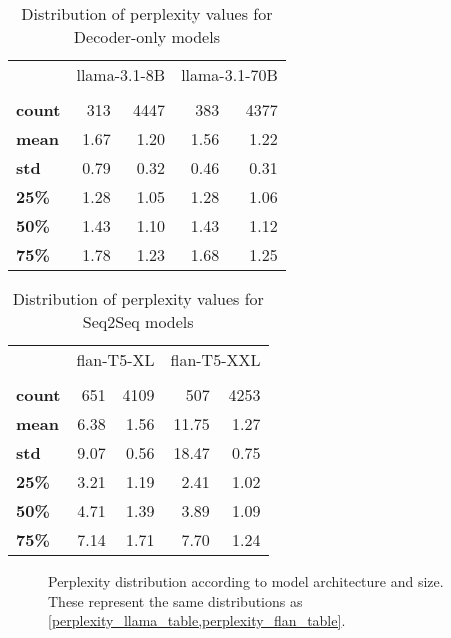 \begin{table}[ht]
	\centering
	\footnotesize
	\begin{tabular}{>{\bfseries}l | r r | r r}
		\toprule
			& \multicolumn{2}{|c}{\ttfamily llama-3.1-8B} & \multicolumn{2}{|c}{\ttfamily llama-3.1-70B} \\
			& \Parametric{} & \Contextual{} & \Parametric{} & \Contextual{} \\
		\midrule
			count &  313 & 4447 &  383 & 4377  \\
			mean  & 1.67 & 1.20 & 1.56 & 1.22  \\
			std   & 0.79 & 0.32 & 0.46 & 0.31  \\
			25\%  & 1.28 & 1.05 & 1.28 & 1.06  \\
			50\%  & 1.43 & 1.10 & 1.43 & 1.12  \\
			75\%  & 1.78 & 1.23 & 1.68 & 1.25  \\
		\bottomrule
	\end{tabular}
	\caption{Distribution of perplexity values for Decoder-only models}
	\label{perplexity_llama_table}
\end{table}

\begin{table}[ht]
	\centering
	\footnotesize
	\begin{tabular}{>{\bfseries}l | r r | r r}
		\toprule
			& \multicolumn{2}{|c}{\ttfamily flan-T5-XL} & \multicolumn{2}{|c}{\ttfamily flan-T5-XXL} \\
			& \Parametric{} & \Contextual{} & \Parametric{} & \Contextual{} \\
		\midrule
			count &  651 & 4109 &   507 & 4253 \\
			mean  & 6.38 & 1.56 & 11.75 & 1.27 \\
			std   & 9.07 & 0.56 & 18.47 & 0.75 \\
			25\%  & 3.21 & 1.19 &  2.41 & 1.02 \\
			50\%  & 4.71 & 1.39 &  3.89 & 1.09 \\
			75\%  & 7.14 & 1.71 &  7.70 & 1.24 \\
		\bottomrule
	\end{tabular}
	\caption{Distribution of perplexity values for Seq2Seq models}
	\label{perplexity_flan_table}
\end{table}

\begin{figure}[H]
	\centering
	\caption{Perplexity distribution according to model architecture and size. These represent the same distributions as \cref{perplexity_llama_table,perplexity_flan_table}.}
	\label{perplexity_results}
\end{figure}


